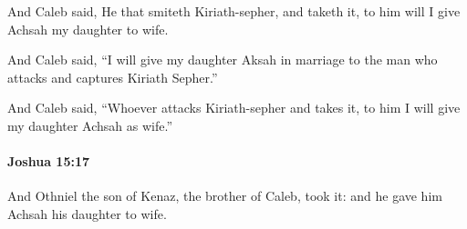 			\begin{versebox}
					\item[BHS] 
					\item[ASV] And Caleb said, He that smiteth Kiriath-sepher, and taketh it, to him will I give Achsah my daughter to wife.
					\item[NIV] And Caleb said, “I will give my daughter Aksah in marriage to the man who attacks and captures Kiriath Sepher.”
					\item[NRSV] And Caleb said, “Whoever attacks Kiriath-sepher and takes it, to him I will give my daughter Achsah as wife.”
			\end{versebox}

		\paragraph{Joshua 15:17} %
			\label{JOSHUA-15-17}

			And Othniel the son of Kenaz, the brother of Caleb, took it: and he gave him Achsah his daughter to wife.

